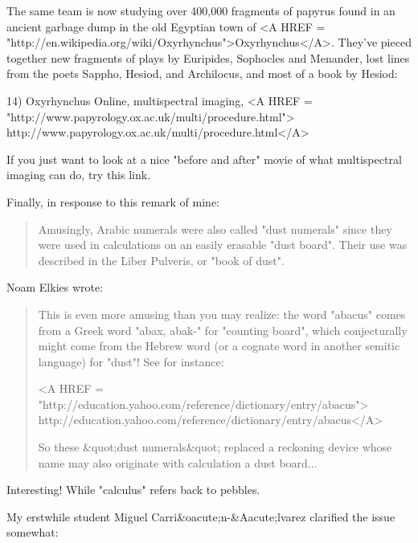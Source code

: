 The same team is now studying over 400,000 fragments of papyrus found 
in an ancient garbage dump in the old Egyptian town of 
<A HREF = "http://en.wikipedia.org/wiki/Oxyrhynchus">Oxyrhynchus</A>.  They've
pieced together new fragments of plays by Euripides, Sophocles and Menander,
lost lines from the poets Sappho, Hesiod, and Archilocus, and most of
a book by Hesiod:

14) Oxyrhynchus Online, multispectral imaging,
<A HREF = "http://www.papyrology.ox.ac.uk/multi/procedure.html">
http://www.papyrology.ox.ac.uk/multi/procedure.html</A>

If you just want to look at a nice "before and after" 
movie of what multispectral imaging can do, try this link.

Finally, in response to this remark of mine:

\begin{quote}
Amusingly, Arabic numerals were also called "dust numerals" since 
they were used in calculations on an easily erasable "dust board".
Their use was described in the Liber Pulveris, or "book of dust".
\end{quote}
    

Noam Elkies wrote:

\begin{quote}
This is even more amusing than you may realize: the word "abacus"
comes from a Greek word "abax, abak-" for "counting board", which
conjecturally might come from the Hebrew word (or a cognate word
in another semitic language) for "dust"!  See for instance:

<A HREF = "http://education.yahoo.com/reference/dictionary/entry/abacus">
http://education.yahoo.com/reference/dictionary/entry/abacus</A>

So these &quot;dust numerals&quot; replaced a reckoning device whose name
may also originate with calculation a dust board...
\end{quote}
    

Interesting!  While "calculus" refers back to pebbles.  

My erstwhile student
Miguel Carri&oacute;n-&Aacute;lvarez 
clarified the issue somewhat:

